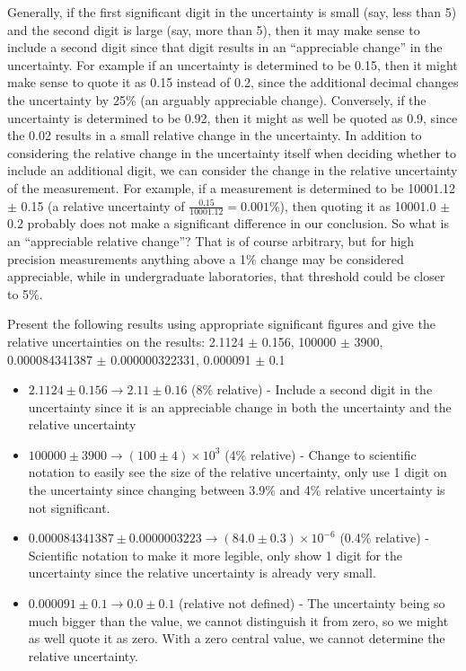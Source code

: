 Generally, if the first significant digit in the uncertainty is small (say, less than 5) and the second digit is large (say, more than 5), then it may make sense to include a second digit since that digit results in an ``appreciable change'' in the uncertainty. For example if an uncertainty is determined to be 0.15, then it might make sense to quote it as 0.15 instead of 0.2, since the additional decimal changes the uncertainty by 25\% (an arguably appreciable change). Conversely, if the uncertainty is determined to be 0.92, then it might as well be quoted as 0.9, since the 0.02 results in a small relative change in the uncertainty. In addition to considering the relative change in the uncertainty itself when deciding whether to include an additional digit, we can consider the change in the relative uncertainty of the measurement. For example, if a measurement is determined to be 10001.12 $\pm$ 0.15 (a relative uncertainty of $\frac{0.15}{10001.12}=0.001\%$), then quoting it as 10001.0 $\pm$ 0.2 probably does not make a significant difference in our conclusion. So what is an ``appreciable relative change''? That is of course arbitrary, but for high precision measurements anything above a 1\% change may be considered appreciable, while in undergraduate laboratories, that threshold could be closer to 5\%. 

\begin{example}{0pt}{Present the following results using appropriate significant figures and give the relative uncertainties on the results: 2.1124 $\pm$ 0.156, 100000 $\pm$ 3900, 0.000084341387 $\pm$ 0.000000322331, 0.000091 $\pm$ 0.1}{}
\begin{itemize}
 \item $2.1124 \pm 0.156 \rightarrow 2.11 \pm 0.16$ (8\% relative) - Include a second digit in the uncertainty since it is an appreciable change in both the uncertainty and the relative uncertainty
 \item $100000 \pm 3900 \rightarrow (100 \pm 4)\times 10^3$ (4\% relative) - Change to scientific notation to easily see the size of the relative uncertainty, only use 1 digit on the uncertainty since changing between 3.9\% and 4\% relative uncertainty is not significant.
 \item $0.000084341387 \pm 0.0000003223 \rightarrow (84.0 \pm 0.3)\times 10^{-6}$ (0.4\% relative) - Scientific notation to make it more legible, only show 1 digit for the uncertainty since the relative uncertainty is already very small.
 \item $0.000091 \pm 0.1 \rightarrow 0.0 \pm 0.1$ (relative not defined) - The uncertainty being so much bigger than the value, we cannot distinguish it from zero, so we might as well quote it as zero. With a zero central value, we cannot determine the relative uncertainty. 
\end{itemize}

\end{example}

